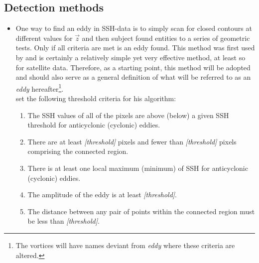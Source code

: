 \subsection{Detection methods} \label{subsec:detectmethods}
\begin{itemize}

	\item
	One way to find an eddy in SSH-data is to simply scan for closed contours at different values for $\vec{z}$ and then subject found entities to a series of geometric tests. Only if all criteria are met is an eddy found. This method was first used by \citet{Chelton2011} and is certainly a relatively simple yet very effective method, at least so for satellite data. Therefore, as a starting point, this method will be adopted and should also serve as a general definition of what will be referred to as an \textit{eddy} hereafter\footnote{The vortices will have names deviant from \textit{eddy} where these criteria are altered.}.\\
	\citeauthor{Chelton2011} set the following threshold criteria for his algorithm:
	\begin{enumerate}
		\item
		The SSH values of all of the pixels are above (below) a given SSH threshold for anticyclonic (cyclonic) eddies.
		\item
		There are at least \textit{[threshold]} pixels and fewer than \textit{[threshold]} pixels comprising the connected region.
		\item
		There is at least one local maximum (minimum) of SSH for anticyclonic (cyclonic) eddies.
		\item
		The amplitude of the eddy is at least \textit{[threshold]}.
		\item
		The distance between any pair of points within the connected region must be less than \textit{[threshold]}.
	\end{enumerate}


\end{itemize}

